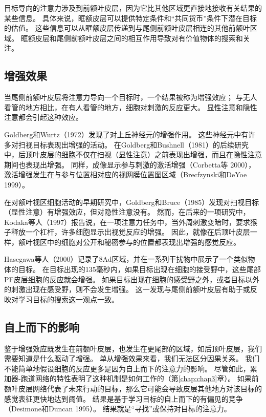 目标导向的注意力涉及到前额叶皮层，因为它比其他区域更直接地接收有关结果的某些信息。
具体来说，眶额皮层可以提供特定条件和“共同货币”条件下潜在目标的估值。
这些信息可以从眶额皮层传递到与尾侧前额叶皮层相连的其他前额叶区域。
眶额皮层和尾侧前额叶皮层之间的相互作用导致对有价值物体的搜索和关注。



\subsection{增强效果}

当尾侧前额叶皮层将注意力导向一个目标时，一个结果被称为增强效应；
与无人看管的地方相比，在有人看管的地方，细胞对刺激的反应更大。
显性注意和隐性注意都会引起这种效应。


Goldberg和Wurtz（1972）发现了对上丘神经元的增强作用。
这些神经元中有许多对扫视目标表现出增强的活动。
在Goldberg和Bushnell（1981）的后续研究中，后顶叶皮层的细胞不仅在扫视（显性注意）之前表现出增强，而且在隐性注意期间也表现出增强。
同样，成像显示参与刺激的激活增强（Corbetta等 2000），激活增强发生在与参与位置相对应的视网膜位置图区域（Brecfzynski和DeYoe 1999）。


在对额叶视区细胞活动的早期研究中，Goldberg和Bruce（1985）发现对扫视目标（显性注意）有增强效应，但对隐性注意没有。
然而，在后来的一项研究中，Kodaka等人（1997）报告说，在一项注意力任务中，当外周刺激变暗时，要求猴子释放一个杠杆，许多细胞显示出视觉反应的增强。
因此，就像在后顶叶皮层一样，额叶视区中的细胞对公开和秘密参与的位置都表现出增强的感觉反应。


Hasegawa等人（2000）记录了8Ad区域，并在一系列干扰物中展示了一个类似物体的目标。
在目标出现的135毫秒内，如果目标出现在细胞的接受野中，这些尾部PF皮层细胞的反应就会增强。
如果目标出现在细胞的感受野之外，或者目标以外的刺激出现在感受野，则不会发生增强。
这一发现与尾侧前额叶皮层有助于或反映对学习目标的搜索这一观点一致。



\subsection{自上而下的影响}

鉴于增强效应既发生在前额叶皮层，也发生在更尾部的区域，如后顶叶皮层，我们需要知道是什么驱动了增强。
单从增强效果来看，我们无法区分因果关系。
我们不能简单地假设细胞的反应更多是因为自上而下的注意力的影响。
尽管如此，累加器-跑道网络的特性表明了这种机制是如何工作的（第\ref{chap:chap3}章）。
如果前额叶皮层网络代表了未来行动的目标，那么它可能会导致皮层其他地方对该目标的感觉表征更快地达到阈值。
结果是基于学习目标的自上而下的有偏见的竞争（Desimone和Duncan 1995）。
结果就是“寻找”或保持对目标的注意力。


